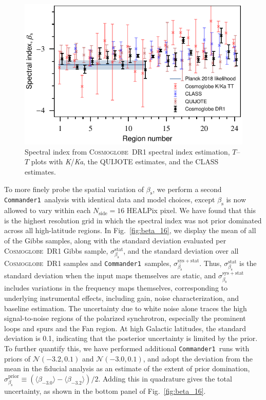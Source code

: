 \documentclass[twocolumn]{../../common/aa}
\def\commanderone{\texttt{Commander1}}
\newcommand{\cosmoglobe}{\textsc{Cosmoglobe}}
\newcommand{\K}[0]{\textit K}
\newcommand{\Ka}[0]{\textit{Ka}}
\begin{document}
\begin{figure}
	\centering
	\includegraphics[width=\columnwidth]{figures/compare_betas.pdf}
	\caption{Spectral index from \cosmoglobe\ DR1 spectral index estimation, $T$--$T$ plots with \K/\Ka, the QUIJOTE estimates, and the CLASS estimates.
	}
	\label{fig:beta_comp}
\end{figure}


To more finely probe the spatial variation of $\beta_\mathrm s$, we perform a second \commanderone\ analysis with identical data and model choices, except $\beta_\mathrm s$ is now allowed to vary within each $N_\mathrm{side}=16$ HEALPix pixel. We have found that this is the highest resolution grid in which the spectral index was not prior dominated across all high-latitude regions. In Fig.~\ref{fig:beta_16}, we display the mean of all of the Gibbs samples, along with the standard deviation evaluated per \cosmoglobe\ DR1 Gibbs sample, $\sigma_{\beta_\mathrm s}^\mathrm{stat}$, and the standard deviation over all \cosmoglobe\ DR1 samples and \commanderone\ samples, $\sigma_{\beta_\mathrm s}^\mathrm{sys+stat}$. Thus, $\sigma_{\beta_\mathrm s}^\mathrm{stat}$ is the standard deviation when the input maps themselves are static, and $\sigma_{\beta_\mathrm s}^\mathrm{sys+stat}$ includes variations in the frequency maps themselves, corresponding to underlying instrumental effects, including gain, noise characterization, and baseline estimation. The uncertainty due to white noise alone  traces the high signal-to-noise regions of the polarized synchrotron, especially the prominent loops and spurs and the Fan region. At high Galactic latitudes, the standard deviation is 0.1, indicating that the posterior uncertainty is limited by the prior. To further quantify this, we have performed additional \commanderone\ runs with priors of $\mathcal N(-3.2,0.1)$ and $\mathcal N(-3.0,0.1)$, and adopt the deviation from the mean in the fiducial analysis as an estimate of the extent of prior domination, $\sigma_{\beta_\mathrm s}^\mathrm{prior}\equiv (\langle \beta_{-3.0}\rangle-\langle\beta_{-3.2}\rangle)/2$. Adding this in quadrature gives the total uncertainty, as shown in the bottom panel of Fig.~\ref{fig:beta_16}.
\end{document}

